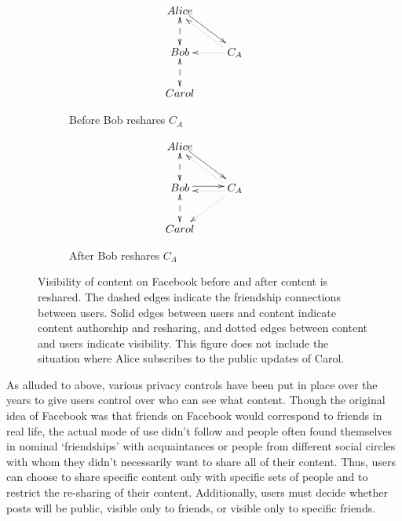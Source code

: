 \begin{figure}
  \centering
  \begin{subfigure}[b]{0.3\textwidth}
    \centering
    \begin{displaymath}
    \xymatrix{
    Alice \ar@<0.5ex>[dr] &  \\
    Bob \ar@{<-->}[u] \ar@{<-->}[d]  & C_{A} \ar@{.>}@<0.5ex>[ul] \ar@{.>}[l] \\
    Carol  & }
    \end{displaymath}
    \caption{Before Bob reshares $C_{A}$}
    \label{fig:fb_reshare_before}

  \end{subfigure}
  \quad
  \begin{subfigure}[b]{0.3\textwidth}
    \centering
    \begin{displaymath}
    \xymatrix{
    Alice \ar@<0.5ex>[dr] &  \\
    Bob \ar@{<-->}[u] \ar@{<-->}[d] \ar@<0.5ex>[r] & C_{A} \ar@{.>}@<0.5ex>[ul] \ar@<0.5ex>@{.>}[l] \ar@{.>}[dl] \\
    Carol  & }
    \end{displaymath}
    \caption{After Bob reshares $C_{A}$}
    \label{fig:fb_reshare_after} 
  \end{subfigure}
  \caption[Visibility of reshared content on Facebook]{Visibility of content on Facebook before and after content is reshared. The dashed edges indicate the friendship connections between users. Solid edges between users and content indicate content authorship and resharing, and dotted edges between content and users indicate visibility. This figure does not include the situation where Alice subscribes to the public updates of Carol. }
  \label{fig:fb_reshare}
\end{figure}


As alluded to above, various privacy controls have been put in place over the years to give users control over who can see what content. Though the original idea of Facebook was that friends on Facebook would correspond to friends in real life, the actual mode of use didn't follow and people often found themselves in nominal `friendships' with acquaintances or people from different social circles with whom they didn't necessarily want to share all of their content. Thus, users can choose to share specific content only with specific sets of people and to restrict the re-sharing of their content. Additionally, users must decide whether posts will be public, visible only to friends, or visible only to specific friends.

